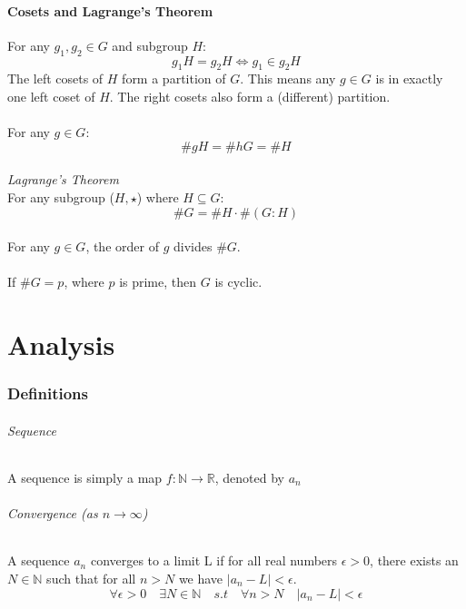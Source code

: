 \documentclass{article}
\newcommand{\R}{\mathbb{R}}
\newcommand{\N}{\mathbb{N}}
\begin{document}
\subsection{Cosets and Lagrange's Theorem}
For any $ g_{1}, g_{2} \in G $ and subgroup $ H $:
\begin{equation}
g_{1}H = g_{2}H \Leftrightarrow g_{1} \in g_{2}H
\end{equation}
The left cosets of $ H $ form a partition of $ G $. This means any $ g \in G $ is in exactly one left coset of $ H $. The right cosets also form a (different) partition.
\\\\
For any $ g \in G $:
\begin{equation}
\#gH = \#hG = \#H
\end{equation}
\\
\textit{Lagrange's Theorem}
\\
For any subgroup ($ H, \star $) where $ H \subseteq G $:
\begin{equation}
\#G = \#H \cdot \#(G : H)
\end{equation}
\\
For any $ g \in G $, the order of $ g $ divides $ \#G $.
\\\\
If $ \#G = p $, where $ p $ is prime, then $ G $ is cyclic.

\newpage
\part{Analysis}

\section{Definitions}
\paragraph{Sequence}
A sequence is simply a map $ f: \N \to \R $, denoted by $ a_{n} $
\paragraph{Convergence (as $ n \to \infty $)}
A sequence $ a_{n} $ converges to a limit L if for all real numbers $ \epsilon > 0 $, there exists an $ N \in \N $ such that for all $ n > N $ we have $ |a_{n} - L| < \epsilon $.
\begin{equation}
\forall \epsilon > 0 \quad \exists N \in \N \quad s.t \quad \forall n > N \quad |a_{n} - L| < \epsilon
\end{equation}
\end{document}
